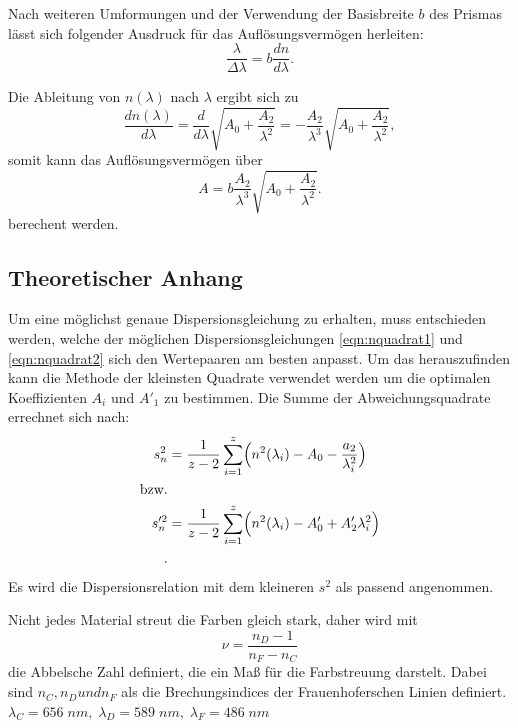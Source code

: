 Nach weiteren Umformungen und der Verwendung der Basisbreite $b$ des
Prismas lässt sich folgender Ausdruck für das Auflösungsvermögen
herleiten:
\begin{equation}
  \frac{\lambda}{\Delta \lambda}=b\frac{dn}{d\lambda}.
  \label{eqn:auflösungsvermögen}
\end{equation}

Die Ableitung von $n(\lambda)$ nach $\lambda$ ergibt sich zu
\begin{equation}
  \frac{dn(\lambda)}{d\lambda}=\frac{d}{d\lambda}\sqrt{A_0+\frac{A_2}{\lambda^2}}
  =-\frac{A_2}{\lambda^3}\sqrt{A_0+\frac{A_2}{\lambda^2}},
\end{equation}
somit kann das Auflösungsvermögen über
\begin{equation}
  A=b\frac{A_2}{\lambda^3}{\sqrt{A_0+\frac{A_2}{\lambda^2}}}.
  \label{eqn:auflösungsver}
\end{equation}
berechent werden.

\subsection{Theoretischer Anhang}
Um eine möglichst genaue Dispersionsgleichung zu erhalten, muss
entschieden werden, welche der möglichen Dispersionsgleichungen
\ref{eqn:nquadrat1} und \ref{eqn:nquadrat2} sich den Wertepaaren
am besten anpasst. Um das herauszufinden kann die Methode der
kleinsten Quadrate verwendet werden um die optimalen Koeffizienten
$A_i$ und $A'_1$ zu bestimmen.
Die Summe der Abweichungsquadrate errechnet sich nach:
\begin{align}
  s_{n}^{2}&=\frac{1}{z-2}\sum_{i=1}^{z} \Bigl(n^2(\lambda_i)-A_0-\frac{a_2}{\lambda_{i}^{2}}\Bigr) \\
  \text{bzw.}\\
  s_{n}'^{2}&=\frac{1}{z-2}\sum_{i=1}^{z} \Bigl(n^2(\lambda_i)-A'_0+A'_{2}\lambda_{i}^{2}\Bigr) \\.
  \label{eqn:abweichungquadrat}
\end{align}
Es wird die Dispersionsrelation mit dem kleineren $s^2$ als passend angenommen.

Nicht jedes Material streut die Farben gleich stark, daher wird mit
\begin{equation}
  \nu=\frac{n_D -1}{n_F-n_C}
  \label{eqn:abbel}
\end{equation}
die Abbelsche Zahl definiert, die ein Maß für die Farbstreuung darstelt.
Dabei sind $n_C, n_D und n_F$ als die Brechungsindices der Frauenhoferschen
Linien definiert.
$\lambda_C=656\;nm,\;\lambda_D=589\;nm,\;\lambda_F=486\;nm$
